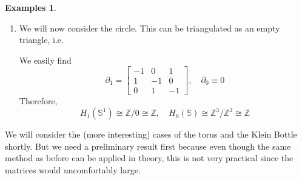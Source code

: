 \documentclass[toc=bib]{scrartcl}
\theoremstyle{plain}
\theoremstyle{definition}
\newtheorem{examples}[theorem]{Examples}
\theoremstyle{remark}
\newcommand{\isom}{\cong}
\newcommand{\Z}{\mathbb{Z}}
\newcommand{\Sp}{\mathbb{S}}
\begin{document}
\begin{examples}
\begin{enumerate}
\item We will now consider the circle. This can be triangulated as an empty triangle, i.e.
\begin{center}
	
\end{center}

We easily find 
\[
\partial_1=\begin{bmatrix}
-1&0&1\\1&-1&0\\0&1&-1
\end{bmatrix},\quad \partial_0\equiv 0
\]
Therefore,
\[H_1(\Sp^1)\isom\Z/0\isom\Z,\quad H_0(\Sp)\isom\Z^3/\Z^2\isom\Z
\]
%
%
	\end{enumerate}
%

We will consider the (more interesting) cases of the torus and the Klein Bottle shortly. But we need a preliminary result first because even though the same method as before can be applied in theory, this is not very practical since the matrices would uncomfortably large.


\end{examples}
\end{document}
